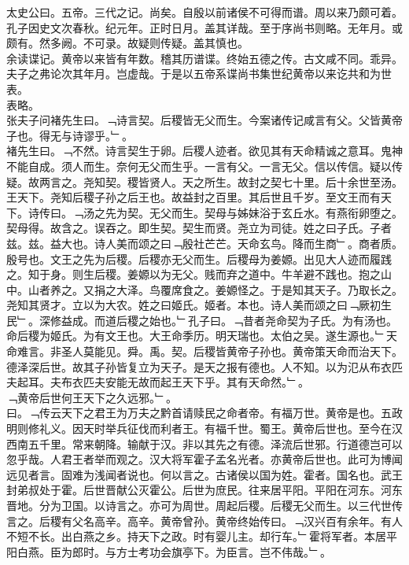 \documentclass{zhvt-classic}
\begin{document}





\hspace*{2em}太史公曰。五帝。三代之记。尚矣。自殷以前诸侯不可得而谱。周以来乃颇可着。孔子因史文次春秋。纪元年。正时日月。盖其详哉。至于序尚书则略。无年月。或颇有。然多阙。不可录。故疑则传疑。盖其慎也。\\
\hspace*{2em}余读谍记。黄帝以来皆有年数。稽其历谱谍。终始五德之传。古文咸不同。乖异。夫子之弗论次其年月。岂虚哉。于是以五帝系谍尚书集世纪黄帝以来讫共和为世表。\\
\hspace*{2em}表略。\\
\hspace*{2em}张夫子问褚先生曰。﹁诗言契。后稷皆无父而生。今案诸传记咸言有父。父皆黄帝子也。得无与诗谬乎。﹂。\\
\hspace*{2em}褚先生曰。﹁不然。诗言契生于卵。后稷人迹者。欲见其有天命精诚之意耳。鬼神不能自成。须人而生。奈何无父而生乎。一言有父。一言无父。信以传信。疑以传疑。故两言之。尧知契。稷皆贤人。天之所生。故封之契七十里。后十余世至汤。王天下。尧知后稷子孙之后王也。故益封之百里。其后世且千岁。至文王而有天下。诗传曰。﹁汤之先为契。无父而生。契母与姊妹浴于玄丘水。有燕衔卵堕之。契母得。故含之。误吞之。即生契。契生而贤。尧立为司徒。姓之曰子氏。子者兹。兹。益大也。诗人美而颂之曰﹁殷社芒芒。天命玄鸟。降而生商﹂。商者质。殷号也。文王之先为后稷。后稷亦无父而生。后稷母为姜嫄。出见大人迹而履践之。知于身。则生后稷。姜嫄以为无父。贱而弃之道中。牛羊避不践也。抱之山中。山者养之。又捐之大泽。鸟覆席食之。姜嫄怪之。于是知其天子。乃取长之。尧知其贤才。立以为大农。姓之曰姬氏。姬者。本也。诗人美而颂之曰﹁厥初生民﹂。深修益成。而道后稷之始也。﹂孔子曰。﹁昔者尧命契为子氏。为有汤也。命后稷为姬氏。为有文王也。大王命季历。明天瑞也。太伯之吴。遂生源也。﹂天命难言。非圣人莫能见。舜。禹。契。后稷皆黄帝子孙也。黄帝策天命而治天下。德泽深后世。故其子孙皆复立为天子。是天之报有德也。人不知。以为氾从布衣匹夫起耳。夫布衣匹夫安能无故而起王天下乎。其有天命然。﹂。\\
\hspace*{2em}﹁黄帝后世何王天下之久远邪。﹂。\\
\hspace*{2em}曰。﹁传云天下之君王为万夫之黔首请赎民之命者帝。有福万世。黄帝是也。五政明则修礼义。因天时举兵征伐而利者王。有福千世。蜀王。黄帝后世也。至今在汉西南五千里。常来朝降。输献于汉。非以其先之有德。泽流后世邪。行道德岂可以忽乎哉。人君王者举而观之。汉大将军霍子孟名光者。亦黄帝后世也。此可为博闻远见者言。固难为浅闻者说也。何以言之。古诸侯以国为姓。霍者。国名也。武王封弟叔处于霍。后世晋献公灭霍公。后世为庶民。往来居平阳。平阳在河东。河东晋地。分为卫国。以诗言之。亦可为周世。周起后稷。后稷无父而生。以三代世传言之。后稷有父名高辛。高辛。黄帝曾孙。黄帝终始传曰。﹁汉兴百有余年。有人不短不长。出白燕之乡。持天下之政。时有婴儿主。却行车。﹂霍将军者。本居平阳白燕。臣为郎时。与方士考功会旗亭下。为臣言。岂不伟哉。﹂。\\
\end{document}
